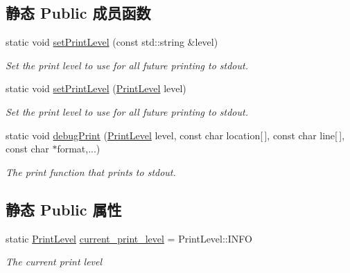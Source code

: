 \subsection*{静态 Public 成员函数}
\begin{DoxyCompactItemize}
\item 
static void \hyperlink{classov__core_1_1Printer_a46c933308a512618c304afefee62ead8}{set\+Print\+Level} (const std\+::string \&level)
\begin{DoxyCompactList}\small\item\em Set the print level to use for all future printing to stdout. \end{DoxyCompactList}\item 
static void \hyperlink{classov__core_1_1Printer_a3edd554248a7e269f4c1d0d3f84a257b}{set\+Print\+Level} (\hyperlink{classov__core_1_1Printer_a1c4c6c612ec6251afd91a1ddf933a0b2}{Print\+Level} level)
\begin{DoxyCompactList}\small\item\em Set the print level to use for all future printing to stdout. \end{DoxyCompactList}\item 
static void \hyperlink{classov__core_1_1Printer_a5371993bfa709539ca870884f7c76f78}{debug\+Print} (\hyperlink{classov__core_1_1Printer_a1c4c6c612ec6251afd91a1ddf933a0b2}{Print\+Level} level, const char location\mbox{[}$\,$\mbox{]}, const char line\mbox{[}$\,$\mbox{]}, const char $\ast$format,...)
\begin{DoxyCompactList}\small\item\em The print function that prints to stdout. \end{DoxyCompactList}\end{DoxyCompactItemize}
\subsection*{静态 Public 属性}
\begin{DoxyCompactItemize}
\item 
\mbox{\label{classov__core_1_1Printer_a29f197352b671a22704ffdd8354b33bd}} 
static \hyperlink{classov__core_1_1Printer_a1c4c6c612ec6251afd91a1ddf933a0b2}{Print\+Level} \hyperlink{classov__core_1_1Printer_a29f197352b671a22704ffdd8354b33bd}{current\+\_\+print\+\_\+level} = Print\+Level\+::\+I\+N\+FO
\begin{DoxyCompactList}\small\item\em The current print level \end{DoxyCompactList}\end{DoxyCompactItemize}


